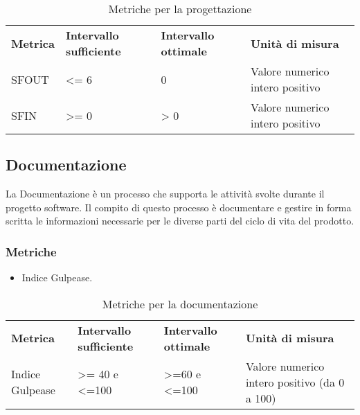 \renewcommand{\arraystretch}{2.2}
\begin{longtable}{|C{4.5cm}|C{2.25cm}|C{2.25cm}|C{3cm}|}

	\caption{Metriche per la progettazione}\\
	\hline

	\textbf{Metrica} & \textbf{Intervallo sufficiente}  & \textbf{Intervallo ottimale} & \textbf{Unità di misura}
	\tabularnewline
	\endfirsthead

	SFOUT & <= 6  & 0 & Valore numerico intero positivo \\
	SFIN &  >= 0 & > 0 & Valore numerico intero positivo \\
\end{longtable}




\subsection{Documentazione}
La Documentazione è un processo che supporta le attività svolte durante
il progetto software.
Il compito di questo processo è documentare e
gestire in forma scritta le informazioni necessarie per le diverse parti del
ciclo di vita del prodotto.
\subsubsection{Metriche}
\begin{itemize}
	\item Indice Gulpease.
\end{itemize}

\renewcommand{\arraystretch}{2.2}
\begin{longtable}{|C{2.5cm}|C{3.25cm}|C{3.25cm}|C{3cm}|}

	\caption{Metriche per la documentazione}\\
	\hline

	\textbf{Metrica} & \textbf{Intervallo sufficiente}  & \textbf{Intervallo ottimale} & \textbf{Unità di misura}
	\tabularnewline
	\endfirsthead

	Indice Gulpease & >= 40 e <=100  & >=60 e <=100 & Valore numerico intero positivo (da 0 a 100) \\

\end{longtable}




